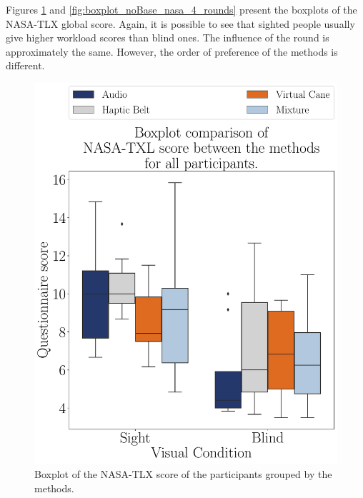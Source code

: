 Figures \ref{fig:boxplot_noBase_nasa_4_scene} and \ref{fig:boxplot_noBase_nasa_4_rounds} present the boxplots of the NASA-TLX global score. Again, it is possible to see that sighted people usually give higher workload scores than blind ones. The influence of the round is approximately the same. However, the order of preference of the methods is different.

\begin{figure}[!htb]
    \centering
    \begin{minipage}{0.45\textwidth}
        \centering
        \includegraphics[width = \textwidth]{Resultados/Nasa/Figuras/pdf/boxplot_noBase_nasa_4_scene.pdf}
        \caption{Boxplot of the NASA-TLX score of the participants grouped by the methods.}
        \label{fig:boxplot_noBase_nasa_4_scene}
    \end{minipage}
    \begin{minipage}{0.075\textwidth}
        \hfill
    \end{minipage}
    \begin{minipage}{0.45\textwidth}

\end{minipage}
\end{figure}
